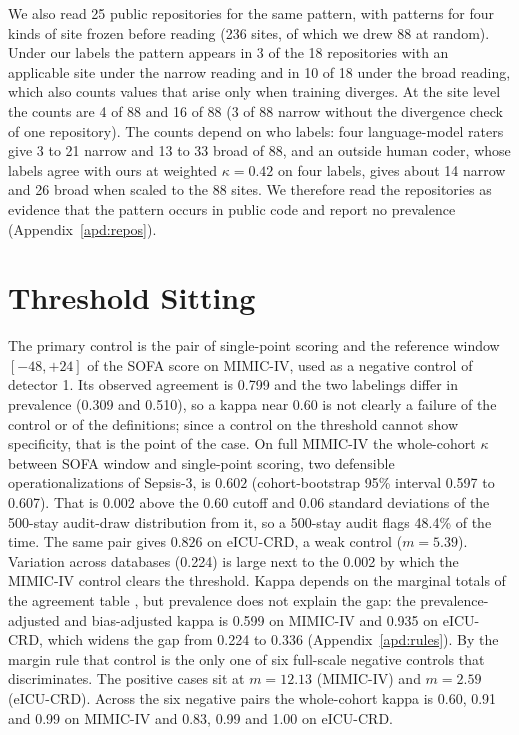 \documentclass[10pt]{article}
\theoremstyle{definition}
\begin{document}
We also read 25 public repositories for the same pattern, with patterns for four kinds of site frozen before reading (236 sites, of which we drew 88 at random). Under our labels the pattern appears in 3 of the 18 repositories with an applicable site under the narrow reading and in 10 of 18 under the broad reading, which also counts values that arise only when training diverges. At the site level the counts are 4 of 88 and 16 of 88 (3 of 88 narrow without the divergence check of one repository). The counts depend on who labels: four language-model raters give 3 to 21 narrow and 13 to 33 broad of 88, and an outside human coder, whose labels agree with ours at weighted $\kappa=0.42$ on four labels, gives about 14 narrow and 26 broad when scaled to the 88 sites. We therefore read the repositories as evidence that the pattern occurs in public code and report no prevalence (Appendix~\ref{apd:repos}).

\section{Threshold Sitting}
\label{sec:type2}

The primary control is the pair of single-point scoring and the reference window $[-48,+24]$ of the SOFA score on MIMIC-IV, used as a negative control of detector 1. Its observed agreement is 0.799 and the two labelings differ in prevalence (0.309 and 0.510), so a kappa near 0.60 is not clearly a failure of the control or of the definitions; since a control on the threshold cannot show specificity, that is the point of the case. On full MIMIC-IV the whole-cohort $\kappa$ between SOFA window and single-point scoring, two defensible operationalizations of Sepsis-3, is $0.602$ (cohort-bootstrap 95\% interval 0.597 to 0.607). That is 0.002 above the 0.60 cutoff and 0.06 standard deviations of the 500-stay audit-draw distribution from it, so a 500-stay audit flags 48.4\% of the time. The same pair gives $0.826$ on eICU-CRD, a weak control ($m=5.39$). Variation across databases (0.224) is large next to the 0.002 by which the MIMIC-IV control clears the threshold. Kappa depends on the marginal totals of the agreement table \citep{feinstein1990high}, but prevalence does not explain the gap: the prevalence-adjusted and bias-adjusted kappa is 0.599 on MIMIC-IV and 0.935 on eICU-CRD, which widens the gap from 0.224 to 0.336 (Appendix~\ref{apd:rules}). By the margin rule that control is the only one of six full-scale negative controls that discriminates. The positive cases sit at $m=12.13$ (MIMIC-IV) and $m=2.59$ (eICU-CRD). Across the six negative pairs the whole-cohort kappa is 0.60, 0.91 and 0.99 on MIMIC-IV and 0.83, 0.99 and 1.00 on eICU-CRD.
\end{document}
